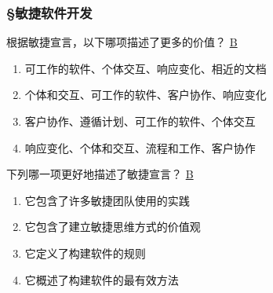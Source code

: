 \subsubsection*{\S 敏捷软件开发}
\setcounter{problemname}{0}

\begin{problem}
	根据敏捷宣言，以下哪项描述了更多的价值？
	\uline{B}    
        \begin{enumerate}[label=\Alph*.]
            \item 可工作的软件、个体交互、响应变化、相近的文档
            \item 个体和交互、可工作的软件、客户协作、响应变化
            \item 客户协作、遵循计划、可工作的软件、个体交互
            \item 响应变化、个体和交互、流程和工作、客户协作
        \end{enumerate}
\end{problem}



\begin{problem}
	下列哪一项更好地描述了敏捷宣言？
	\uline{B}    
    \vspace{-0.8em}
    \begin{multicols}{2}
        \begin{enumerate}[label=\Alph*.]
            \item 它包含了许多敏捷团队使用的实践
            \item 它包含了建立敏捷思维方式的价值观
            \item 它定义了构建软件的规则
            \item 它概述了构建软件的最有效方法
        \end{enumerate}
    \end{multicols}
    \vspace{-1em}
\end{problem}




